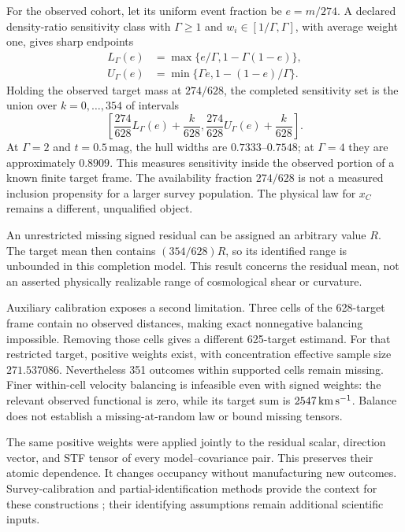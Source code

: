 For the observed cohort, let its uniform event fraction be $e=m/274$. A declared density-ratio sensitivity class with $\Gamma\geq1$ and $w_i\in[1/\Gamma,\Gamma]$, with average weight one, gives sharp endpoints
\begin{align}
 L_\Gamma(e)&=\max\{e/\Gamma,1-\Gamma(1-e)\},\nonumber\\
 U_\Gamma(e)&=\min\{\Gamma e,1-(1-e)/\Gamma\}.
 \label{eq:selectionbounds}
\end{align}
Holding the observed target mass at $274/628$, the completed sensitivity set is the union over $k=0,\ldots,354$ of intervals
\begin{equation}
 \left[\frac{274}{628}L_\Gamma(e)+\frac{k}{628},
 \frac{274}{628}U_\Gamma(e)+\frac{k}{628}\right].
\end{equation}
At $\Gamma=2$ and $t=0.5\,\mathrm{mag}$, the hull widths are $0.7333$--$0.7548$; at $\Gamma=4$ they are approximately $0.8909$. This measures sensitivity inside the observed portion of a known finite target frame. The availability fraction $274/628$ is not a measured inclusion propensity for a larger survey population. The physical law for $x_C$ remains a different, unqualified object.

An unrestricted missing signed residual can be assigned an arbitrary value $R$. The target mean then contains $(354/628)R$, so its identified range is unbounded in this completion model. This result concerns the residual mean, not an asserted physically realizable range of cosmological shear or curvature.

Auxiliary calibration exposes a second limitation. Three cells of the 628-target frame contain no observed distances, making exact nonnegative balancing impossible. Removing those cells gives a different 625-target estimand. For that restricted target, positive weights exist, with concentration effective sample size $271.537086$. Nevertheless 351 outcomes within supported cells remain missing. Finer within-cell velocity balancing is infeasible even with signed weights: the relevant observed functional is zero, while its target sum is $2547\,\mathrm{km}\,\mathrm{s}^{-1}$. Balance does not establish a missing-at-random law or bound missing tensors.

The same positive weights were applied jointly to the residual scalar, direction vector, and STF tensor of every model--covariance pair. This preserves their atomic dependence. It changes occupancy without manufacturing new outcomes. Survey-calibration and partial-identification methods provide the context for these constructions \cite{Deville1992,ImbensManski2004,AronowLee2013}; their identifying assumptions remain additional scientific inputs.

